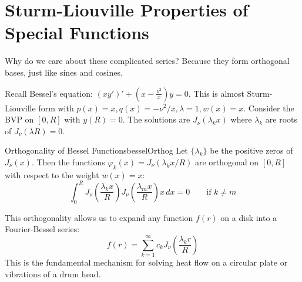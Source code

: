 \documentclass{book}
\renewcommand{\phi}{\varphi}
\begin{document}
\section*{Sturm-Liouville Properties of Special Functions}

Why do we care about these complicated series? Because they form orthogonal bases, just like sines and cosines.

Recall Bessel's equation: $(x y')' + (x - \frac{\nu^2}{x})y = 0$. This is almost Sturm-Liouville form with $p(x)=x, q(x)=-\nu^2/x, \lambda=1, w(x)=x$.
Consider the BVP on $[0, R]$ with $y(R)=0$. The solutions are $J_\nu(\lambda_k x)$ where $\lambda_k$ are roots of $J_\nu(\lambda R) = 0$.

\begin{thm}{Orthogonality of Bessel Functions}{besselOrthog}
    Let $\{\lambda_k\}$ be the positive zeros of $J_\nu(x)$. Then the functions $\phi_k(x) = J_\nu(\lambda_k x/R)$ are orthogonal on $[0, R]$ with respect to the weight $w(x) = x$:
    \[
        \int_0^R J_\nu\left(\frac{\lambda_k x}{R}\right) J_\nu\left(\frac{\lambda_m x}{R}\right) x \, dx = 0 \qquad \text{if } k \ne m
    \]
\end{thm}

This orthogonality allows us to expand any function $f(r)$ on a disk into a Fourier-Bessel series:
\[
    f(r) = \sum_{k=1}^\infty c_k J_\nu\left(\frac{\lambda_k r}{R}\right)
\]
This is the fundamental mechanism for solving heat flow on a circular plate or vibrations of a drum head.
\end{document}
